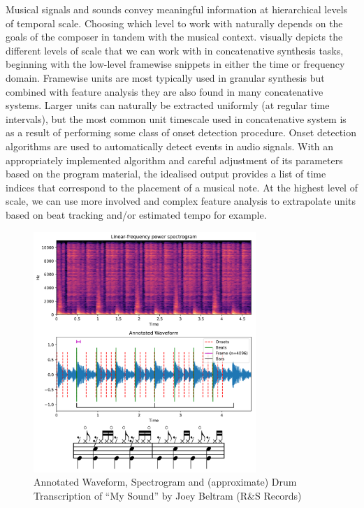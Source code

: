 Musical signals and sounds convey meaningful information at hierarchical levels of temporal scale. Choosing which level to work with naturally depends on the goals of the composer in tandem with the musical context.  visually depicts the different levels of scale that we can work with in concatenative synthesis tasks, beginning with the low-level framewise snippets in either the time or frequency domain. Framewise units are most typically used in granular synthesis but combined with feature analysis they are also found in many concatenative systems. Larger units can naturally be extracted uniformly (at regular time intervals), but the most common unit timescale used in concatenative system is as a result of performing some class of onset detection procedure. Onset detection algorithms are used to automatically detect events in audio signals. With an appropriately implemented algorithm and careful adjustment of its parameters based on the program material, the idealised output provides a list of time indices that correspond to the placement of a musical note. At the highest level of scale, we can use more involved and complex feature analysis to extrapolate units based on beat tracking and/or estimated tempo for example.  

\begin{figure}
	\begin{center}
		\includegraphics[width=0.75\textwidth]{ch05_pyconcat/figures/unit_plot.png}
	\end{center}
	\caption[Annotated Waveform, Spectrogram and Drum Transcription of ``My Sound'' by Joey Beltram (R\&S Records)]{Annotated Waveform, Spectrogram and (approximate) Drum Transcription of ``My Sound'' by Joey Beltram (R\&S Records)}
	\label{fig:beltram}
\end{figure}

